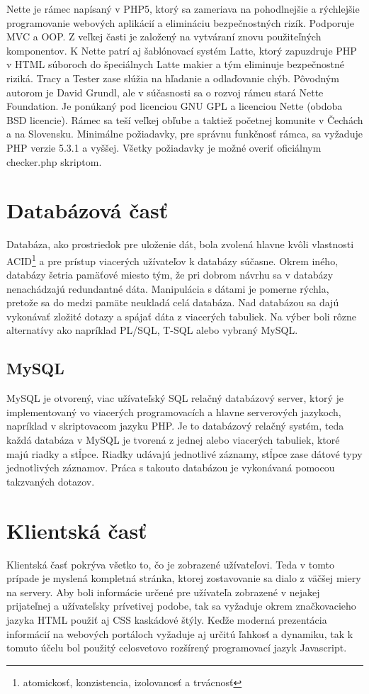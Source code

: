 Nette je rámec napísaný v PHP5, ktorý sa zameriava na pohodlnejšie a rýchlejšie programovanie webových aplikácií a elimináciu bezpečnostných rizík. Podporuje MVC a OOP. Z veľkej časti je založený na vytváraní znovu použiteľných komponentov. K Nette patrí aj šablónovací systém Latte, ktorý zapuzdruje PHP v HTML súboroch do špeciálnych Latte makier a tým eliminuje bezpečnostné riziká. Tracy a Tester zase slúžia na hľadanie a odlaďovanie chýb. Pôvodným autorom je David Grundl, ale v súčasnosti sa o rozvoj rámcu stará Nette Foundation. Je ponúkaný pod licenciou GNU GPL a licenciou Nette (obdoba BSD licencie). Rámec sa teší veľkej obľube a taktiež početnej komunite v Čechách a na Slovensku. Minimálne požiadavky, pre správnu funkčnosť rámca, sa vyžaduje PHP verzie 5.3.1 a vyššej. Všetky požiadavky je možné overiť oficiálnym checker.php skriptom. \cite{Grundl2009}

\section{Databázová časť}
\label{sec:databaza}
Databáza, ako prostriedok pre uloženie dát, bola zvolená hlavne kvôli vlastnosti ACID\footnote{atomickosť, konzistencia, izolovanosť a trvácnosť} a pre prístup viacerých užívateľov k databázy súčasne. Okrem iného, databázy šetria pamäťové miesto tým, že pri dobrom návrhu sa v databázy nenachádzajú redundantné dáta. Manipulácia s dátami je pomerne rýchla, pretože sa do medzi pamäte neukladá celá databáza. Nad databázou sa dajú vykonávať zložité dotazy a spájať dáta z viacerých tabuliek.  Na výber boli rôzne alternatívy ako napríklad PL/SQL, T-SQL alebo vybraný MySQL.   

\subsection{MySQL}
\label{sec:mysql}
MySQL je otvorený, viac užívateľský SQL relačný databázový server, ktorý je implementovaný vo viacerých programovacích a hlavne serverových jazykoch, napríklad v skriptovacom jazyku PHP. Je to databázový relačný systém, teda každá databáza v MySQL je tvorená z jednej alebo viacerých tabuliek, ktoré majú riadky a stĺpce. Riadky udávajú jednotlivé záznamy, stĺpce zase dátové typy jednotlivých záznamov. Práca s takouto databázou je vykonávaná pomocou takzvaných dotazov.

\section{Klientská časť}
\label{sec:klient}
Klientská časť pokrýva všetko to, čo je zobrazené užívateľovi. Teda v tomto prípade je myslená kompletná stránka, ktorej zostavovanie sa dialo z väčšej miery na servery. Aby boli informácie určené pre užívateľa zobrazené v nejakej prijateľnej a užívateľsky prívetivej podobe, tak sa vyžaduje okrem značkovacieho jazyka HTML použiť aj CSS kaskádové štýly. Keďže moderná prezentácia informácií na webových portáloch vyžaduje aj určitú ľahkosť a dynamiku, tak k tomuto účelu bol použitý celosvetovo rozšírený programovací jazyk Javascript.

